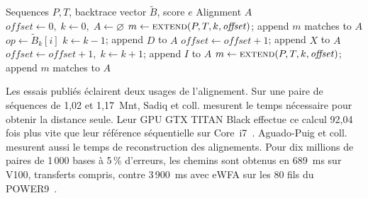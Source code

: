 \begin{algorithm}[!htbp]
\caption{Reconstruction du chemin dans eWFA~\cite[alg.~4, p.~63788]{wfagpu}}\label{alg:article-wfa-trace}
\small
\begin{algorithmic}[1]
\Require Sequences \(P,T\), backtrace vector \(\widetilde B\), score \(e\)
\Ensure Alignment \(A\)
\State \(\mathit{offset}\gets0,\; k\gets0,\; A\gets\varnothing\)
  \State \(m\gets\Call{extend}{P,T,k,\mathit{offset}}\); append \(m\) matches to \(A\)
  \State \(op\gets\widetilde B_k[i]\)
   \State \(k\gets k-1\); append \(D\) to \(A\)
   \State \(\mathit{offset}\gets \mathit{offset}+1\); append \(X\) to \(A\)
   \State \(\mathit{offset}\gets \mathit{offset}+1,\; k\gets k+1\); append \(I\) to \(A\)
  \EndIf
\EndFor
\State \(m\gets\Call{extend}{P,T,k,\mathit{offset}}\); append \(m\) matches to \(A\)
\end{algorithmic}
\end{algorithm}

Les essais publiés éclairent deux usages de l’alignement. Sur une paire de séquences de 1,02 et 1,17~Mnt, Sadiq et coll. mesurent le temps nécessaire pour obtenir la distance seule. Leur GPU GTX TITAN Black effectue ce calcul 92,04 fois plus vite que leur référence séquentielle sur Core~i7~\cite[tabl.~3]{sadiq}. Aguado-Puig et coll. mesurent aussi le temps de reconstruction des alignements. Pour dix millions de paires de 1\,000 bases à 5\,\% d’erreurs, les chemins sont obtenus en 689~ms sur V100, transferts compris, contre 3\,900~ms avec eWFA sur les 80 fils du POWER9~\cite[tabl.~1]{wfagpu}.


